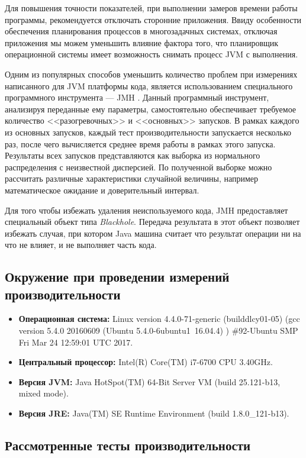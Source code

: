 Для повышения точности показателей, при выполнении замеров времени работы программы, рекомендуется отключать сторонние приложения. Ввиду особенности обеспечения планирования процессов в многозадачных системах, отключая приложения мы можем уменьшить влияние фактора того, что планировщик операционной системы имеет возможность снимать процесс JVM с выполнения.

Одним из популярных способов уменьшить количество проблем при измерениях написанного для JVM платформы кода, является использованием специального программного инструмента --- JMH \cite{java:jmh}. Данный программный инструмент, анализируя переданные ему параметры, самостоятельно обеспечивает требуемое количество <<разогревочных>> и <<основных>> запусков. В рамках каждого из основных запусков, каждый тест производительности запускается несколько раз, после чего вычисляется среднее время работы в рамках этого запуска. Результаты всех запусков представляются как выборка из нормального распределения с неизвестной дисперсией. По полученной выборке можно рассчитать различные характеристики случайной величины, например математическое ожидание и доверительный интервал.

    Для того чтобы избежать удаления неиспользуемого кода, JMH предоставляет специальный объект типа \textit{Blackhole}. Передача результата в этот объект позволяет избежать случая, при котором Java машина считает что результат операции ни на что не влияет, и не выполняет часть кода.

\subsection{Окружение при проведении измерений производительности}

\begin{itemize}
    \item \textbf{Операционная система:} Linux version 4.4.0-71-generic (buildd\at lcy01-05) (gcc version 5.4.0 20160609 (Ubuntu 5.4.0-6ubuntu1~16.04.4) ) \#92-Ubuntu SMP Fri Mar 24 12:59:01 UTC 2017.
    \item \textbf{Центральный процессор:}  Intel(R) Core(TM) i7-6700 CPU \at 3.40GHz.
    \item \textbf{Версия JVM:}  Java HotSpot(TM) 64-Bit Server VM (build 25.121-b13, mixed mode).
    \item \textbf{Версия JRE:}  Java(TM) SE Runtime Environment (build 1.8.0\_121-b13).
\end{itemize}


\subsection{Рассмотренные тесты производительности}

